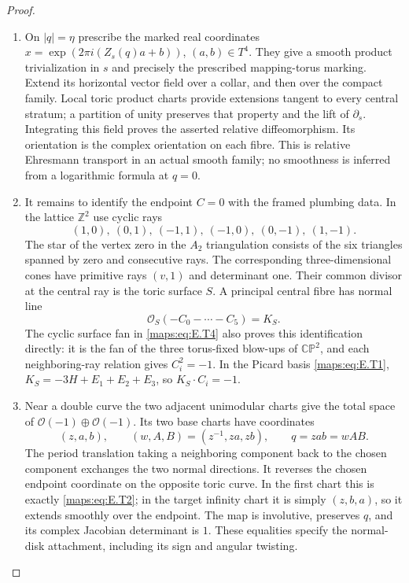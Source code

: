 \begin{proof}
\begin{enumerate}[label=\arabic*.,leftmargin=*]
\item On $|q|=\eta$ prescribe the marked real coordinates
$x=\exp(2\pi i(Z_s(q)a+b))$, $(a,b)\in T^4$.
They give a smooth product trivialization in $s$ and precisely
the prescribed mapping-torus marking.  Extend its horizontal
vector field over a collar, and then over the compact family.
Local toric product charts provide extensions tangent to
every central stratum; a partition of unity preserves that
property and the lift of $\partial_s$.  Integrating this
field proves the asserted relative diffeomorphism.  Its
orientation is the complex orientation on each fibre.
This is relative Ehresmann transport in an actual smooth
family; no smoothness is inferred from a logarithmic formula
at $q=0$.

\item It remains to identify the endpoint $C=0$ with the framed
plumbing data.  In the lattice $\mathbb Z^2$ use cyclic rays
\[
 (1,0),\ (0,1),\ (-1,1),\ (-1,0),\ (0,-1),\ (1,-1).
 \tag{E.T4}\label{maps:eq:E.T4}
\]
The star of the vertex zero in the $A_2$ triangulation consists
of the six triangles spanned by zero and consecutive rays.
The corresponding three-dimensional cones have primitive rays
$(v,1)$ and determinant one.  Their common divisor at the
central ray is the toric surface $S$.  A principal central
fibre has normal line
\[
             \mathcal O_S(-C_0-\cdots-C_5)=K_S.
 \tag{E.T5}\label{maps:eq:E.T5}
\]
The cyclic surface fan in \eqref{maps:eq:E.T4} also proves this identification
directly: it is the fan of the three torus-fixed blow-ups of
$\mathbb {CP}^2$, and each neighboring-ray relation gives
$C_i^2=-1$.  In the Picard basis \eqref{maps:eq:E.T1},
$K_S=-3H+E_1+E_2+E_3$, so $K_S\cdot C_i=-1$.

\item Near a double curve the two adjacent unimodular charts give
the total space of $\mathcal O(-1)\oplus\mathcal O(-1)$.
Its two base charts have coordinates
\[
 (z,a,b),\qquad
 (w,A,B)=(z^{-1},za,zb),\qquad q=zab=wAB.
 \tag{E.T6}\label{maps:eq:E.T6}
\]
The period translation taking a neighboring component back
to the chosen component exchanges the two normal directions.
It reverses the chosen endpoint coordinate on the opposite
toric curve.  In the first chart this is exactly \eqref{maps:eq:E.T2};
in the target infinity chart it is simply $(z,b,a)$, so it
extends smoothly over the endpoint.  The map is involutive,
preserves $q$, and its complex Jacobian determinant is $1$.
These equalities specify the normal-disk attachment, including
its sign and angular twisting.


\end{enumerate}
\end{proof}
